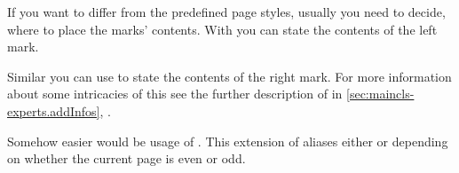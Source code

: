   \begin{Declaration}
  \end{Declaration}
  If you want to differ from the predefined page styles, usually you need to
  decide, where to place the marks' contents. With  you can
  state the contents of the left mark.

  Similar you can use  to state the contents of the right
  mark. For more information about some intricacies of this see the further
  description of  in
  \autoref{sec:maincls-experts.addInfos},
  .

  Somehow easier would be usage of . This extension of
   aliases either  or 
  depending on whether the current page is even or odd.

